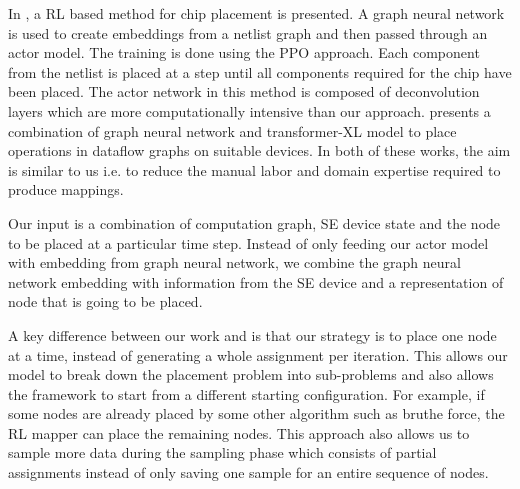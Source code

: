 In \cite{mirhoseini2020chip}, a RL based method for chip placement is presented. A graph neural network is used to create embeddings from a netlist graph and then passed through an actor model. The training is done using the PPO approach. Each component from the netlist is placed at a step until all components required for the chip have been placed. The actor network in this method is composed of deconvolution layers which are more computationally intensive than our approach. 
\cite{zhou2019gdp} presents a combination of graph neural network and transformer-XL model to place operations in dataflow graphs on suitable devices.
In both of these works, the aim is similar to us i.e. to reduce the manual labor and domain expertise required to produce mappings.

Our input is a combination of computation graph, SE device state and the node to be placed at a particular time step. 
Instead of only feeding our actor model with embedding from graph neural network, we combine the graph neural network embedding with information from the SE device and a representation of node that is going to be placed. 

A key difference between our work and \cite{zhou2019gdp} is that our strategy is to place one node at a time, instead of generating a whole assignment per iteration. 
This allows our model to break down the placement problem into sub-problems and also allows the framework to start from a different starting configuration. For example, if some nodes are already placed by some other algorithm such as bruthe force, the RL mapper can place the remaining nodes. 
This approach also allows us to sample more data during the sampling phase which consists of partial assignments instead of only saving one sample for an entire sequence of nodes.  
